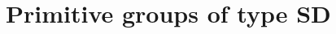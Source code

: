 \documentclass{beamer}
\theoremstyle{plain}
\theoremstyle{definition}
\begin{document}
%

%
%
%
%

\section{Primitive groups of type SD}
\end{document}
